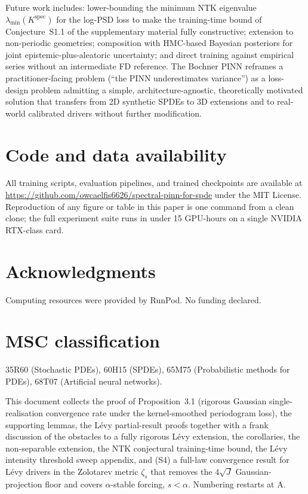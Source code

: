 \documentclass[review,12pt]{elsarticle}
\begin{document}
Future work includes: lower-bounding the minimum NTK eigenvalue
$\lambda_{\min}(K^{\mathrm{spec}})$ for the log-PSD loss to make the
training-time bound of Conjecture~S1.1 of the supplementary material fully constructive;
extension to non-periodic geometries; composition with HMC-based
Bayesian posteriors for joint epistemic-plus-aleatoric uncertainty;
and direct training against empirical series without an intermediate FD
reference. The Bochner PINN reframes a practitioner-facing problem
(``the PINN underestimates variance'') as a loss-design problem
admitting a simple, architecture-agnostic, theoretically motivated
solution that transfers from 2D synthetic SPDEs to 3D extensions and
to real-world calibrated drivers without further modification.

\section*{Code and data availability}

All training scripts, evaluation pipelines, and trained checkpoints
are available at
\url{https://github.com/owcaelfis6626/spectral-pinn-for-spde} under the
MIT License. Reproduction of any figure or table in this paper is
one command from a clean clone; the full experiment suite runs in
under 15 GPU-hours on a single NVIDIA RTX-class card.

\section*{Acknowledgments}

Computing resources were provided by RunPod. No funding declared.

\section*{MSC classification}

35R60 (Stochastic PDEs), 60H15 (SPDEs), 65M75 (Probabilistic
methods for PDEs), 68T07 (Artificial neural networks).


\clearpage
\noindent This document collects the proof of
Proposition~3.1 (rigorous Gaussian single-realisation convergence
rate under the kernel-smoothed periodogram loss), the supporting
lemmas, the L\'evy partial-result proofs together with a frank
discussion of the obstacles to a fully rigorous L\'evy extension,
the corollaries, the non-separable extension, the NTK conjectural
training-time bound, the L\'evy intensity threshold sweep
appendix, and (S4) a full-law convergence result for L\'evy drivers
in the Zolotarev metric $\zeta_s$ that removes the $4\sqrt J$
Gaussian-projection floor and covers $\alpha$-stable forcing,
$s < \alpha$. Numbering restarts at A.
\end{document}
